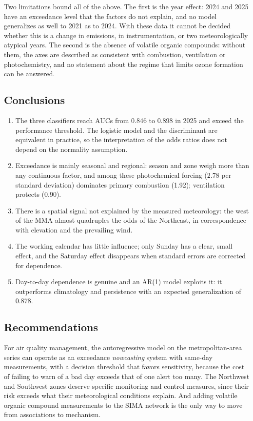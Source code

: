 Two limitations bound all of the above. The first is the year effect: 2024
and 2025 have an exceedance level that the factors do not explain, and no
model generalizes as well to 2021 as to 2024. With these data it cannot be
decided whether this is a change in emissions, in instrumentation, or two
meteorologically atypical years. The second is the absence of volatile
organic compounds: without them, the axes are described as consistent with
combustion, ventilation or photochemistry, and no statement about the regime
that limits ozone formation can be answered.

\subsection{Conclusions}

\begin{enumerate}[label=\roman*.]
  \item The three classifiers reach AUCs from 0.846 to 0.898 in 2025 and
    exceed the performance threshold. The logistic model and the
    discriminant are equivalent in practice, so the interpretation of the
    odds ratios does not depend on the normality assumption.
  \item Exceedance is mainly seasonal and regional: season and zone weigh
    more than any continuous factor, and among these photochemical forcing
    (2.78 per standard deviation) dominates primary combustion (1.92);
    ventilation protects (0.90).
  \item There is a spatial signal not explained by the measured meteorology:
    the west of the MMA almost quadruples the odds of the Northeast, in
    correspondence with elevation and the prevailing wind.
  \item The working calendar has little influence; only Sunday has a clear,
    small effect, and the Saturday effect disappears when standard errors
    are corrected for dependence.
  \item Day-to-day dependence is genuine and an AR(1) model exploits it: it
    outperforms climatology and persistence with an expected generalization
    of 0.878.
\end{enumerate}

\subsection{Recommendations}

For air quality management, the autoregressive model on the
metropolitan-area series can operate as an exceedance \emph{nowcasting}
system with same-day measurements, with a decision threshold that favors
sensitivity, because the cost of failing to warn of a bad day exceeds that of
one alert too many. The Northwest and Southwest zones deserve specific
monitoring and control measures, since their risk exceeds what their
meteorological conditions explain. And adding volatile organic compound
measurements to the SIMA network is the only way to move from associations
to mechanism.

